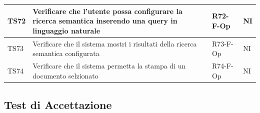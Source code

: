 \documentclass[a4paper,12pt]{article}
\begin{document}
\begin{longtable}{|M{1.2cm}|M{6.3cm}|M{2.5cm}|M{1.5cm}|}
                TS72 & Verificare che l'utente possa configurare la ricerca semantica inserendo una query in linguaggio naturale & R72-F-Op & NI \\
                \hline
                                
                TS73 & Verificare che il sistema mostri i risultati della ricerca semantica configurata & R73-F-Op & NI \\
                \hline
                                
                TS74 & Verificare che il sistema permetta la stampa di un documento selzionato & R74-F-Op & NI \\
                \hline
            \end{longtable}


        \subsection{Test di Accettazione}
\end{document}
